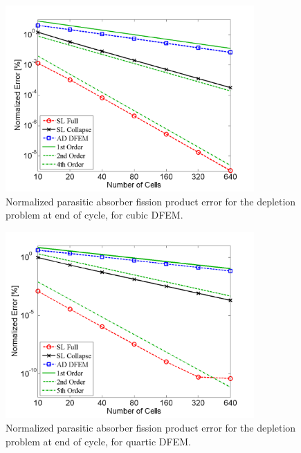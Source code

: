\newpage

\begin{figure}[!htp]
\centering
\includegraphics[width=9.5cm]{chapter5_depletion/FPA_P3_norm_err.png}
\caption{Normalized parasitic absorber fission product error for the depletion problem at end of cycle, for cubic DFEM.}
\label{fig:depletion_NFPA_p3}
\end{figure}
%
\begin{figure}[!hbp]
\centering
\includegraphics[width=9.5cm]{chapter5_depletion/FPA_P4_norm_err.png}
\caption{Normalized parasitic absorber fission product error for the depletion problem at end of cycle, for quartic DFEM.}
\label{fig:depletion_NFPA_p4}
\end{figure}  

\newpage

